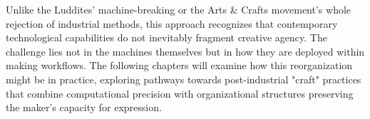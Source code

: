 \vspace{0.5cm}

Unlike the Luddites' machine-breaking or the Arts \& Crafts movement's whole rejection of industrial methods, this approach recognizes that contemporary technological capabilities do not inevitably fragment creative agency. The challenge lies not in the machines themselves but in how they are deployed within making workflows. The following chapters will examine how this reorganization might be in practice, exploring pathways towards post-industrial "craft" practices that combine computational precision with organizational structures preserving the maker's capacity for expression.